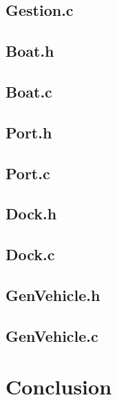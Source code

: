 \documentclass[a4paper, 11pt]{article}
\begin{document}
	\subsection{Gestion.c}
		
	\subsection{Boat.h}
		
	\subsection{Boat.c}
		
	\subsection{Port.h}
		
	\subsection{Port.c}
		
	\subsection{Dock.h}
		
	\subsection{Dock.c}
		
	\subsection{GenVehicle.h}
		
	\subsection{GenVehicle.c}
		

\section{Conclusion}
\end{document}
